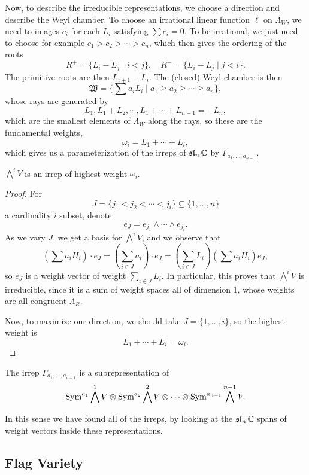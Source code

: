 \documentclass[12pt]{article}
\newcommand{\fsl}{\operatorname{\mathfrak{sl}}}
\newcommand{\fW}{\mathfrak{W}}
\begin{document}
Now, to describe the irreducible representations, we choose a direction and describe the Weyl chamber. To choose an irrational linear function $\ell$ on $\Lambda_W$, we need to images $c_i$ for each $L_i$ satisfying $\sum c_i = 0$. To be irrational, we just need to choose for example $c_1>c_2>\cdots>c_n$, which then gives the ordering of the roots
\[R^+ = \{L_i - L_j \mid i< j\}, \quad R^- = \{L_i - L_j \mid j <i\}.\]
The primitive roots are then $L_{i+1}-L_i$. The (closed) Weyl chamber is then
\[\fW = \{\sum a_i L_i \mid a_1\geq a_2\geq \cdots \geq a_n\},\]
whose rays are generated by
\[L_1, L_1 + L_2, \cdots, L_1+\cdots+L_{n-1} = -L_n,\]
which are the smallest elements of $\Lambda_W$ along the rays, so these are the fundamental weights,
\[\omega_i = L_1 + \cdots + L_i,\]
which gives us a parameterization of the irreps of $\fsl_n \C$ by $\Gamma_{a_1,\dots,a_{n-1}}$.

\begin{prop}
    $\bigwedge^i V$ is an irrep of highest weight $\omega_i$.
\end{prop}

\begin{proof}
    For
    \[J = \{j_1<j_2<\cdots<j_i\} \subseteq \{1,\dots,n\}\]
    a cardinality $i$ subset, denote
    \[e_J = e_{j_1}\wedge \cdots \wedge e_{j_i}.\]
    As we vary $J$, we get a basis for $\bigwedge^i V$, and we observe that
    \[(\sum a_i H_i)\cdot e_J = (\sum_{i\in J} a_i) \cdot e_J = (\sum_{i\in J} L_i)(\sum a_i H_i)e_J,\]
    so $e_J$ is a weight vector of weight $\sum_{i\in J} L_i$. In particular, this proves that $\bigwedge^i V$ is irreducible, since it is a sum of weight spaces all of dimension 1, whose weights are all congruent $\Lambda_R$.

    Now, to maximize our direction, we should take $J=\{1,\dots,i\}$, so the highest weight is
    \[L_1+\cdots+L_i = \omega_i.\]
\end{proof}

\begin{cor}
    The irrep $\Gamma_{a_1,\dots,a_{n-1}}$ is a subrepresentation of
    \[\mathrm{Sym}^{a_1} \bigwedge^1 V \otimes \mathrm{Sym}^{a_2}\bigwedge^2 V \otimes \cdots \otimes \mathrm{Sym}^{a_{n-1}}\bigwedge^{n-1} V.\]
\end{cor}

In this sense we have found all of the irreps, by looking at the $\fsl_n \C$ spans of weight vectors inside these representations.

\subsection{Flag Variety}
\end{document}
